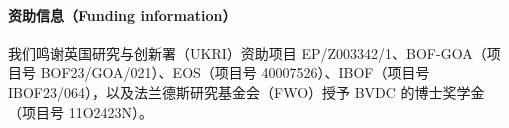 \documentclass{SciPost}
\begin{document}
\paragraph{资助信息（Funding information）}
我们鸣谢英国研究与创新署（UKRI）资助项目 EP/Z003342/1、BOF-GOA（项目号 BOF23/GOA/021）、EOS（项目号 40007526）、IBOF（项目号 IBOF23/064），以及法兰德斯研究基金会（FWO）授予 BVDC 的博士奖学金（项目号 11O2423N）。

\begin{appendix}

\newpage
\newpage

\end{appendix}

\end{document}
